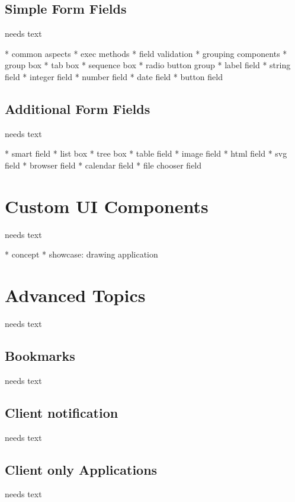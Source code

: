 \documentclass[a4paper,10pt,twoside]{book}
\begin{document}
\section{Simple Form Fields}
needs text

    * common aspects
	  * exec methods
	  * field validation
	* grouping components
	  * group box
	  * tab box
	  * sequence box
      * radio button group
	* label field
	* string field
	* integer field
	* number field
	* date field
	* button field

\section{Additional Form Fields}
needs text

	* smart field
	* list box
	* tree box
	* table field
	* image field	
	* html field
	* svg field
	* browser field
	* calendar field
	* file chooser field
  

\chapter{Custom UI Components}
needs text

  * concept
  * showcase: drawing application
    
\chapter{Advanced Topics}
needs text


\section{Bookmarks}
needs text
  
\section{Client notification}
needs text
    
\section{Client only Applications}
needs text
  
\end{document}

